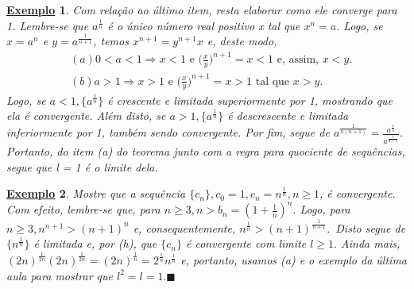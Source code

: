 \documentclass{article}
\newtheorem{example}{\underline{Exemplo}}
\renewcommand\qedsymbol{$\blacksquare$}
\begin{document}
\begin{example}
   Com rela\c c\~ao ao \'ultimo item, resta elaborar como ele converge para 1. Lembre-se que $a^{\frac{1}{n}}$ \'e o \'unico n\'umero real positivo
  x tal que $x^{n} = a.$ Logo, se $x = a^{n} $ e $y = a^{\frac{1}{n+1}}$, temos $x^{n+1} = y^{n+1}x$ e, deste modo,
  \begin{align*}
  & (a) 0 < a < 1 \Rightarrow x < 1 \text{ e } \biggl(\frac{x}{y}\biggr)^{n+1} = x < 1\text{ e, assim, } x < y.\\
  & (b) a > 1 \Rightarrow x > 1\text{ e }\biggl(\frac{x}{y}\biggr)^{n+1} = x > 1\text{ tal que } x > y.
  \end{align*}
  Logo, se $a < 1,\{a^{\frac{1}{n}}\} $ \'e crescente e limitada superiormente por 1, mostrando que ela \'e convergente. Al\'em disto,
se $a > 1,\{a^{\frac{1}{n}}\} $ \'e descrescente e limitada inferiormente por 1, tamb\'em sendo convergente. Por fim, segue de
$a^{\frac{1}{n(n+1)}} = \frac{a^{\frac{1}{n}}}{a^{\frac{1}{n+1}}}$. Portanto, do item (a) do teorema junto com a regra para quociente de
sequ\^encias, segue que l = 1 \'e o limite dela.
\end{example}\begin{example}
   Mostre que a sequ\^encia $\{c_{n}\}, c_{0} = 1, c_{n} = n^{\frac{1}{n}}, n\geq{1}$, \'e convergente. Com efeito, lembre-se que,
para $n\geq{3}, n > b_{n} = (1+\frac{1}{n})^{n}.$ Logo, para $n\geq{3}, n^{n+1}>(n+1)^{n}$ e, consequentemente, $n^{\frac{1}{n}} > (n+1)^{\frac{1}{n+1}}.$\
Disto segue de $\{n^{\frac{1}{n}}\} $ \'e limitada e, por (h), que $\{c_{n}\} $ \'e convergente com limite $l\geq{1}.$ Ainda mais,
 $(2n)^{\frac{1}{2n}}(2n)^{\frac{1}{2n}} = (2n)^{\frac{1}{n}} = 2^{\frac{1}{n}}n^{\frac{1}{n}}$ e, portanto, usamos (a) e o exemplo da \'ultima aula para
mostrar que $l^{2} = l = 1.$\qedsymbol
 \end{example}
\end{document}
